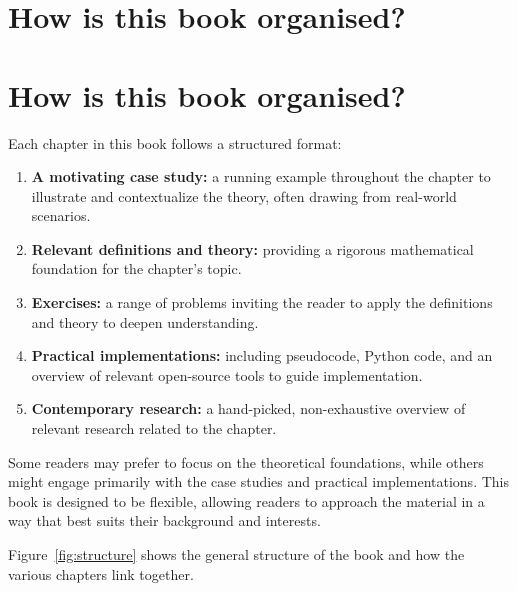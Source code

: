 \section{How is this book organised?}

\section{How is this book organised?}

Each chapter in this book follows a structured format:

\begin{enumerate}
    \item  \textbf{A motivating case study:} a running example throughout the chapter to 
        illustrate and contextualize the theory, often drawing from real-world scenarios.
    \item  \textbf{Relevant definitions and theory:} providing a rigorous mathematical 
        foundation for the chapter’s topic.
    \item  \textbf{Exercises:} a range of problems inviting the reader to apply the definitions 
        and theory to deepen understanding.
    \item  \textbf{Practical implementations:} including pseudocode, Python code, and an 
        overview of relevant open-source tools to guide implementation.
    \item  \textbf{Contemporary research:} a hand-picked, non-exhaustive overview of 
        relevant research related to the chapter.
\end{enumerate}

Some readers may prefer to focus on the theoretical foundations, while others
might engage primarily with the case studies and practical implementations. This
book is designed to be flexible, allowing readers to approach the material in a
way that best suits their background and interests.

Figure~\ref{fig:structure} shows the general structure of the book and how the
various chapters link together.

